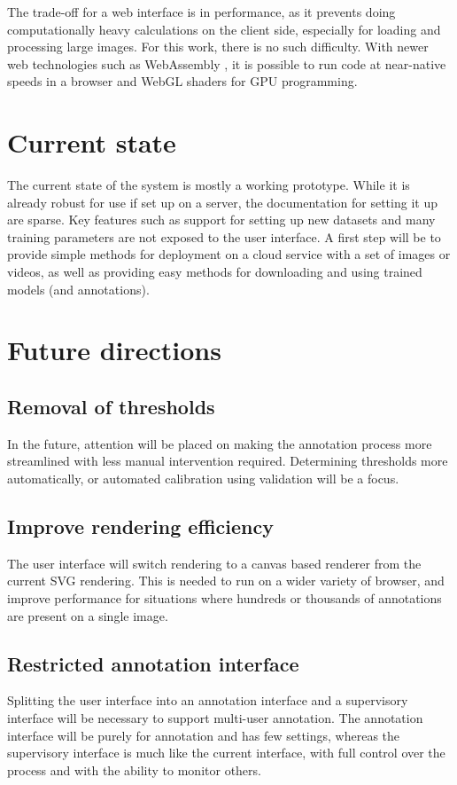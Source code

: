 The trade-off for a web interface is in performance, as it prevents doing computationally heavy calculations on the client side, especially for loading and processing large images. For this work, there is no such difficulty. With newer web technologies such as WebAssembly \cite{Haas2017}, it is possible to run code at near-native speeds in a browser and WebGL shaders for GPU programming.

\section{Current state}
\label{sec:current_state}

The current state of the system is mostly a working prototype. While it is already robust for use if set up on a server, the documentation for setting it up are sparse.  Key features such as support for setting up new datasets and many training parameters are not exposed to the user interface. A first step will be to provide simple methods for deployment on a cloud service with a set of images or videos, as well as providing easy methods for downloading and using trained models (and annotations).

\section{Future directions}
\label{sec:design_future_direction}

\subsection {Removal of thresholds}
In the future, attention will be placed on making the annotation process more streamlined with less manual intervention required. Determining thresholds more automatically, or automated calibration using validation will be a focus.

\subsection {Improve rendering efficiency}
The user interface will switch rendering to a canvas based renderer from the current SVG rendering. This is needed to run on a wider variety of browser, and improve performance for situations where hundreds or thousands of annotations are present on a single image.

\subsection {Restricted annotation interface}
Splitting the user interface into an annotation interface and a supervisory interface will be necessary to support multi-user annotation. The annotation interface will be purely for annotation and has few settings, whereas the supervisory interface is much like the current interface, with full control over the process and with the ability to monitor others.

